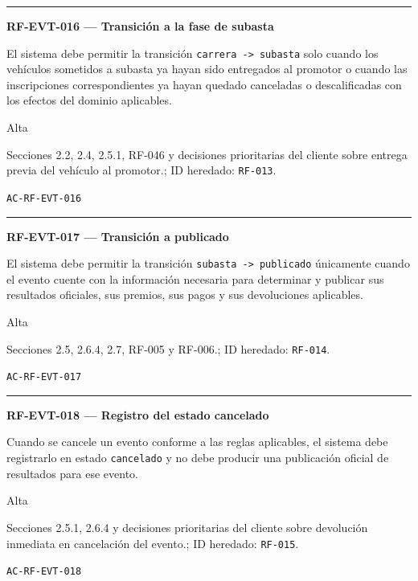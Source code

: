 \documentclass[10pt,letterpaper]{article}
\begin{document}
\vspace{0.25em}\hrule\vspace{0.65em}
\noindent\textbf{RF-EVT-016 --- Transición a la fase de subasta}\par
\begin{description}[style=nextline,leftmargin=3.15cm,labelwidth=2.8cm,font=\normalfont\bfseries]
\item[Obligación] El sistema debe permitir la transición \texttt{carrera -> subasta} solo cuando los vehículos sometidos a subasta ya hayan sido entregados al promotor o cuando las inscripciones correspondientes ya hayan quedado canceladas o descalificadas con los efectos del dominio aplicables.
\item[Prioridad] Alta
\item[Procedencia] Secciones 2.2, 2.4, 2.5.1, RF-046 y decisiones prioritarias del cliente sobre entrega previa del vehículo al promotor.; ID heredado: \texttt{RF-013}.
\item[Verificación] \texttt{AC-RF-EVT-016}
\end{description}
\vspace{0.25em}\hrule\vspace{0.65em}
\noindent\textbf{RF-EVT-017 --- Transición a publicado}\par
\begin{description}[style=nextline,leftmargin=3.15cm,labelwidth=2.8cm,font=\normalfont\bfseries]
\item[Obligación] El sistema debe permitir la transición \texttt{subasta -> publicado} únicamente cuando el evento cuente con la información necesaria para determinar y publicar sus resultados oficiales, sus premios, sus pagos y sus devoluciones aplicables.
\item[Prioridad] Alta
\item[Procedencia] Secciones 2.5, 2.6.4, 2.7, RF-005 y RF-006.; ID heredado: \texttt{RF-014}.
\item[Verificación] \texttt{AC-RF-EVT-017}
\end{description}
\vspace{0.25em}\hrule\vspace{0.65em}
\noindent\textbf{RF-EVT-018 --- Registro del estado cancelado}\par
\begin{description}[style=nextline,leftmargin=3.15cm,labelwidth=2.8cm,font=\normalfont\bfseries]
\item[Obligación] Cuando se cancele un evento conforme a las reglas aplicables, el sistema debe registrarlo en estado \texttt{cancelado} y no debe producir una publicación oficial de resultados para ese evento.
\item[Prioridad] Alta
\item[Procedencia] Secciones 2.5.1, 2.6.4 y decisiones prioritarias del cliente sobre devolución inmediata en cancelación del evento.; ID heredado: \texttt{RF-015}.
\item[Verificación] \texttt{AC-RF-EVT-018}
\end{description}
\end{document}

